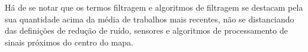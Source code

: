 Há de se notar que os termos filtragem e algoritmos de filtragem se destacam pela sua quantidade acima da média de trabalhos mais recentes, não se distanciando das definições de redução de ruído, sensores e algoritmos de processamento de sinais próximos do centro do mapa.
 






